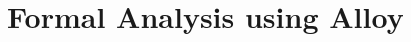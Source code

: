 \documentclass[../rasd.tex]{subfiles}
\begin{document}
\chapter{Formal Analysis using Alloy}
\thispagestyle{fancy}

%
\end{document}
